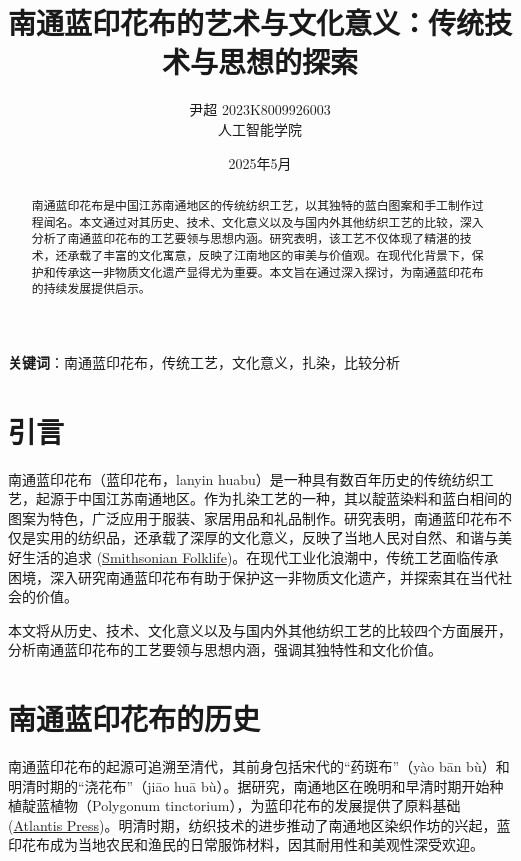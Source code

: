 \documentclass[12pt]{article}
\begin{document}
\title{南通蓝印花布的艺术与文化意义：传统技术与思想的探索}
\author{尹超 2023K8009926003 \\
        人工智能学院}

\date{2025年5月}
\maketitle

\begin{abstract}
南通蓝印花布是中国江苏南通地区的传统纺织工艺，以其独特的蓝白图案和手工制作过程闻名。本文通过对其历史、技术、文化意义以及与国内外其他纺织工艺的比较，深入分析了南通蓝印花布的工艺要领与思想内涵。研究表明，该工艺不仅体现了精湛的技术，还承载了丰富的文化寓意，反映了江南地区的审美与价值观。在现代化背景下，保护和传承这一非物质文化遗产显得尤为重要。本文旨在通过深入探讨，为南通蓝印花布的持续发展提供启示。
\end{abstract}

\textbf{关键词}：南通蓝印花布，传统工艺，文化意义，扎染，比较分析

\section{引言}
南通蓝印花布（蓝印花布，lanyin huabu）是一种具有数百年历史的传统纺织工艺，起源于中国江苏南通地区。作为扎染工艺的一种，其以靛蓝染料和蓝白相间的图案为特色，广泛应用于服装、家居用品和礼品制作。研究表明，南通蓝印花布不仅是实用的纺织品，还承载了深厚的文化意义，反映了当地人民对自然、和谐与美好生活的追求 (\href{https://folklife.si.edu/magazine/blue-calico-cloth-nantong-china}{Smithsonian Folklife})。在现代工业化浪潮中，传统工艺面临传承困境，深入研究南通蓝印花布有助于保护这一非物质文化遗产，并探索其在当代社会的价值。

本文将从历史、技术、文化意义以及与国内外其他纺织工艺的比较四个方面展开，分析南通蓝印花布的工艺要领与思想内涵，强调其独特性和文化价值。

\section{南通蓝印花布的历史}
南通蓝印花布的起源可追溯至清代，其前身包括宋代的“药斑布”（yào bān bù）和明清时期的“浇花布”（jiāo huā bù）。据研究，南通地区在晚明和早清时期开始种植靛蓝植物（Polygonum tinctorium），为蓝印花布的发展提供了原料基础 (\href{https://www.atlantis-press.com/proceedings/hss-17/25873402}{Atlantis Press})。明清时期，纺织技术的进步推动了南通地区染织作坊的兴起，蓝印花布成为当地农民和渔民的日常服饰材料，因其耐用性和美观性深受欢迎。
\end{document}
